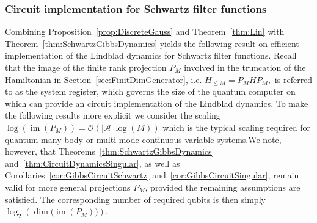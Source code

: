 \documentclass[11pt]{amsart}
\newcommand{\1}{\mathbbm{1}}
\newcommand{\cA}{\mathcal{A}}
\theoremstyle{plain}
\theoremstyle{definition}
\theoremstyle{remark}
\numberwithin{equation}{section}
\begin{document}
\subsubsection{Circuit implementation for Schwartz filter functions}
Combining Proposition~\ref{prop:DiscreteGauss} and Theorem~\ref{thm:Lin} with Theorem~\ref{thm:SchwartzGibbsDynamics} yields the following result on efficient implementation of the Lindblad dynamics for Schwartz filter functions.  Recall that the image of the finite rank projection $P_M$ involved in the truncation of the Hamiltonian in Section~\ref{sec:FinitDimGenerator}, i.e. $H_{\le M} = P_MHP_M,$ is referred to as the system register, which governs the size of the quantum computer on which can provide an circuit implementation of the Lindblad dynamics. To make the following results more explicit we consider the scaling $\log(\operatorname{im}(P_M)) = \mathcal{O}(|\cA|\log(M))$ which is the typical scaling required for quantum many-body or multi-mode continuous variable systems.We note, however, that Theorems~\ref{thm:SchwartzGibbsDynamics} and~\ref{thm:CircuitDynamicsSingular}, as well as Corollaries~\ref{cor:GibbsCircuitSchwartz} and~\ref{cor:GibbsCircuitSingular}, remain valid for more general projections $P_M$, provided the remaining assumptions are satisfied. The corresponding number of required qubits is then simply 
\(
\log_2\left( \dim\bigl(\operatorname{im}(P_M)\bigr)\right).
\)
\end{document}
